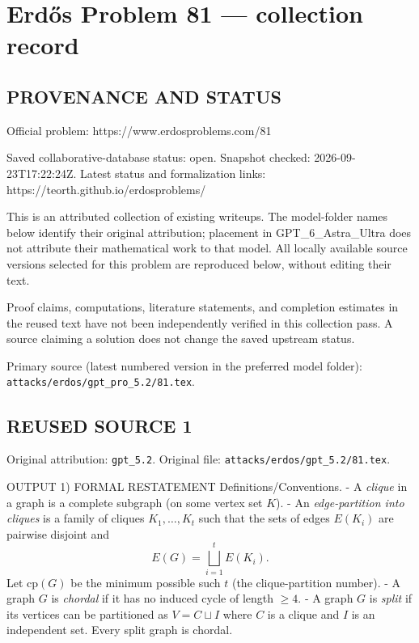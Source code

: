 \section*{Erd\H{o}s Problem 81 --- collection record}

\subsection*{PROVENANCE AND STATUS}
Official problem: https://www.erdosproblems.com/81

Saved collaborative-database status: open.
Snapshot checked: 2026-09-23T17:22:24Z.
Latest status and formalization links: https://teorth.github.io/erdosproblems/

This is an attributed collection of existing writeups. The model-folder names below identify their original attribution; placement in GPT\_6\_Astra\_Ultra does not attribute their mathematical work to that model. All locally available source versions selected for this problem are reproduced below, without editing their text.

Proof claims, computations, literature statements, and completion estimates in the reused text have not been independently verified in this collection pass. A source claiming a solution does not change the saved upstream status.

Primary source (latest numbered version in the preferred model folder): \texttt{attacks/erdos/gpt\_pro\_5.2/81.tex}.

\subsection*{REUSED SOURCE 1}
Original attribution: \texttt{gpt\_5.2}.
Original file: \texttt{attacks/erdos/gpt\_5.2/81.tex}.


OUTPUT
1) FORMAL RESTATEMENT
Definitions/Conventions.
- A \emph{clique} in a graph is a complete subgraph (on some vertex set $K$).
- An \emph{edge-partition into cliques} is a family of cliques $K_1,\dots,K_t$ such that the sets of edges $E(K_i)$ are pairwise disjoint and
\[E(G)=\bigsqcup_{i=1}^t E(K_i).\]
Let $\mathrm{cp}(G)$ be the minimum possible such $t$ (the clique-partition number).
- A graph $G$ is \emph{chordal} if it has no induced cycle of length $\ge 4$.
- A graph $G$ is \emph{split} if its vertices can be partitioned as $V=C\sqcup I$ where $C$ is a clique and $I$ is an independent set.
Every split graph is chordal.

